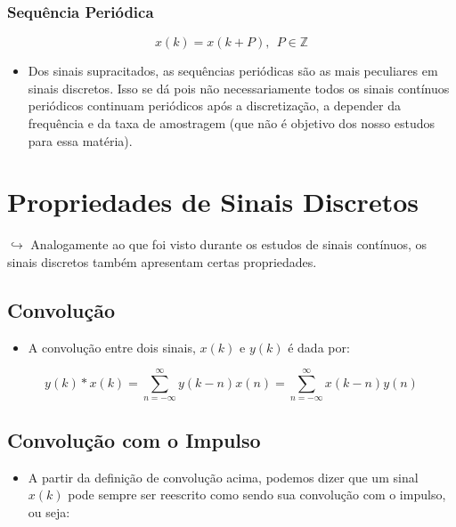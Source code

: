\documentclass{article}
\begin{document}
\begin{itemize}
\hypertarget{sequuxeancia-periuxf3dica}{%
\subsubsection{Sequência Periódica}\label{sequuxeancia-periuxf3dica}}

\[
x(k) = x(k + P),  \ \ P\in \mathbb{Z}
\]

\begin{itemize}
\tightlist
\item
  Dos sinais supracitados, as sequências periódicas são as mais
  peculiares em sinais discretos. Isso se dá pois não necessariamente
  todos os sinais contínuos periódicos continuam periódicos após a
  discretização, a depender da frequência e da taxa de amostragem (que
  não é objetivo dos nosso estudos para essa matéria).
\end{itemize}

\hypertarget{propriedades-de-sinais-discretos}{%
\section{Propriedades de Sinais
Discretos}\label{propriedades-de-sinais-discretos}}

\(\hookrightarrow\) Analogamente ao que foi visto durante os estudos de
sinais contínuos, os sinais discretos também apresentam certas
propriedades.

\hypertarget{convoluuxe7uxe3o}{%
\subsection{Convolução}\label{convoluuxe7uxe3o}}

\begin{itemize}
\tightlist
\item
  A convolução entre dois sinais, \(x(k)\) e \(y(k)\) é dada por:
\end{itemize}

\[
y(k) *x(k) = \sum^{\infty}_{n = -\infty} y(k - n)x(n)=\sum^{\infty}_{n = -\infty} x(k - n)y(n)
\]

\hypertarget{convoluuxe7uxe3o-com-o-impulso}{%
\subsection{Convolução com o
Impulso}\label{convoluuxe7uxe3o-com-o-impulso}}

\begin{itemize}
\tightlist
\item
  A partir da definição de convolução acima, podemos dizer que um sinal
  \(x(k)\) pode sempre ser reescrito como sendo sua convolução com o
  impulso, ou seja:
\end{itemize}


\end{itemize}
\end{document}
